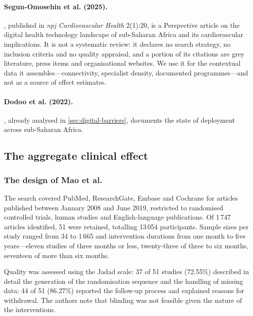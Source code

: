 \documentclass[12pt,a4paper,oneside]{report}
\begin{document}
\paragraph{Segun-Omosehin et al. (2025).} \textcite{segun2025}, published in \emph{npj Cardiovascular Health} 2(1):20, is a Perspective article on the digital health technology landscape of sub-Saharan Africa and its cardiovascular implications. It is not a systematic review: it declares no search strategy, no inclusion criteria and no quality appraisal, and a portion of its citations are grey literature, press items and organisational websites. We use it for the contextual data it assembles---connectivity, specialist density, documented programmes---and not as a source of effect estimates.

\paragraph{Dodoo et al. (2022).} \textcite{dodoo2022}, already analysed in \cref{sec:digital-barriers}, documents the state of deployment across sub-Saharan Africa.

\subsection{The aggregate clinical effect}\label{sec:aggregate-effect}

\subsubsection{The design of Mao et al.}

The search covered PubMed, ResearchGate, Embase and Cochrane for articles published between January 2008 and June 2019, restricted to randomised controlled trials, human studies and English-language publications. Of 1\,747 articles identified, 51 were retained, totalling 13\,054 participants. Sample sizes per study ranged from 34 to 1\,665 and intervention durations from one month to five years---eleven studies of three months or less, twenty-three of three to six months, seventeen of more than six months.

Quality was assessed using the Jadad scale: 37 of 51 studies (72.55\%) described in detail the generation of the randomisation sequence and the handling of missing data; 44 of 51 (86.27\%) reported the follow-up process and explained reasons for withdrawal. The authors note that blinding was not feasible given the nature of the interventions.
\end{document}
